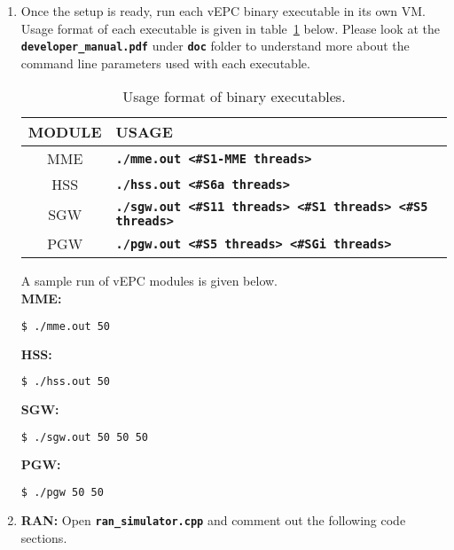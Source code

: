 \documentclass[hidelinks]{report}
\newcommand{\cf}[1] {
	\textbf{\texttt{#1}}
}
\begin{document}
\begin{enumerate}

\item Once the setup is ready, run each vEPC binary executable in its own VM. Usage format of each executable is given in table~\ref{bin_format} below. Please look at the \cf{developer\_manual.pdf} under \cf{doc} folder to understand more about the command line parameters used with each executable.

\begin{table}[H]

\caption{Usage format of binary executables.}
\centering
\label{bin_format}
\def\arraystretch{1.5}

\begin{tabular}{|c|p{11.5 cm}|}

\hline
\textbf{MODULE} & \textbf{USAGE} \\
\hline
MME & \cf{./mme.out <\#S1-MME threads>} \\
HSS & \cf{./hss.out <\#S6a threads>} \\
SGW & \cf{./sgw.out <\#S11 threads> <\#S1 threads> <\#S5 threads>} \\
PGW & \cf{./pgw.out <\#S5 threads> <\#SGi threads>} \\
\hline

\end{tabular}

\end{table}

A sample run of vEPC modules is given below.
~\\ \textbf{MME:}
\begin{lstlisting}[language=bash]
$ ./mme.out 50
\end{lstlisting}

\textbf{HSS:}
\begin{lstlisting}[language=bash]
$ ./hss.out 50
\end{lstlisting}

\textbf{SGW:}
\begin{lstlisting}[language=bash]
$ ./sgw.out 50 50 50
\end{lstlisting}

\textbf{PGW:}
\begin{lstlisting}[language=bash]
$ ./pgw 50 50
\end{lstlisting}

\item \textbf{RAN:} Open \cf{ran\_simulator.cpp} and comment out the following code sections.

\begin{itemize}


\end{itemize}
\end{enumerate}
\end{document}
